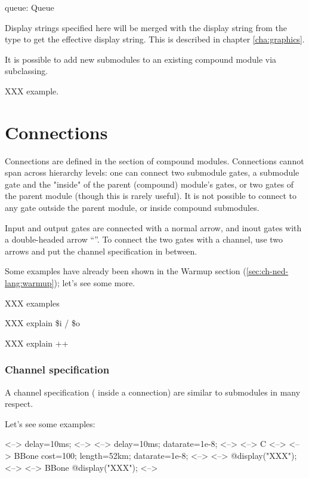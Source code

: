 \begin{ned}
      queue: Queue {
      }
\end{ned}

Display strings specified here will be merged with the display string
from the type to get the effective display string. This is described
in chapter \ref{cha:graphics}.

It is possible to add new submodules to an existing compound module via
subclassing.

XXX example.



\section{Connections}
\label{sec:ch-ned-lang:connections}

Connections are defined in the  section of compound
modules. Connections cannot span across hierarchy levels: one can connect
two submodule gates, a submodule gate and the "inside" of the parent
(compound) module's gates, or two gates of the parent module (though this
is rarely useful). It is not possible to connect to any gate outside the
parent module, or inside compound submodules.

Input and output gates are connected with a normal arrow, and inout gates
with a double-headed arrow ``\ttt{<-{}->}''. To connect the two gates
with a channel, use two arrows and put the channel specification in between.

Some examples have already been shown in the Warmup section
(\ref{sec:ch-ned-lang:warmup}); let's see some more.

XXX examples

XXX explain \$i / \$o

XXX explain ++


\subsubsection{Channel specification}

A channel specification ( inside a connection)
are similar to submodules in many respect.

Let's see some examples:

\begin{ned}
<--> {delay=10ms;} <-->
<--> {delay=10ms; datarate=1e-8;} <-->
<--> C <-->
<--> BBone {cost=100; length=52km; datarate=1e-8;} <-->
<--> {@display("XXX");} <-->
<--> BBone {@display("XXX");} <-->
\end{ned}


